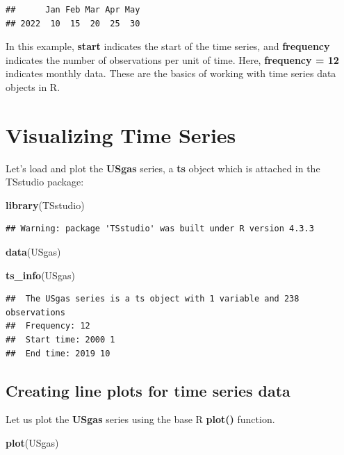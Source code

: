 \documentclass[
]{book}
\newenvironment{Shaded}{\begin{snugshade}}{\end{snugshade}}
\newcommand{\FunctionTok}[1]{\textcolor[rgb]{0.13,0.29,0.53}{\textbf{#1}}}
\newcommand{\NormalTok}[1]{#1}
\begin{document}
\begin{verbatim}
##      Jan Feb Mar Apr May
## 2022  10  15  20  25  30
\end{verbatim}

In this example, \textbf{start} indicates the start of the time series, and \textbf{frequency} indicates the number of observations per unit of time. Here, \textbf{frequency = 12} indicates monthly data. These are the basics of working with time series data objects in R.

\section{Visualizing Time Series}\label{visualizing-time-series}

Let's load and plot the \textbf{USgas} series, a \textbf{ts} object which is attached in the TSstudio package:

\begin{Shaded}
\begin{Highlighting}[]
\FunctionTok{library}\NormalTok{(TSstudio)}
\end{Highlighting}
\end{Shaded}

\begin{verbatim}
## Warning: package 'TSstudio' was built under R version 4.3.3
\end{verbatim}

\begin{Shaded}
\begin{Highlighting}[]
\FunctionTok{data}\NormalTok{(USgas)}

\FunctionTok{ts\_info}\NormalTok{(USgas)}
\end{Highlighting}
\end{Shaded}

\begin{verbatim}
##  The USgas series is a ts object with 1 variable and 238 observations
##  Frequency: 12 
##  Start time: 2000 1 
##  End time: 2019 10
\end{verbatim}

\subsection{Creating line plots for time series data}\label{creating-line-plots-for-time-series-data}

Let us plot the \textbf{USgas} series using the base R \textbf{plot()} function.

\begin{Shaded}
\begin{Highlighting}[]
\FunctionTok{plot}\NormalTok{(USgas)}
\end{Highlighting}
\end{Shaded}
\end{document}
